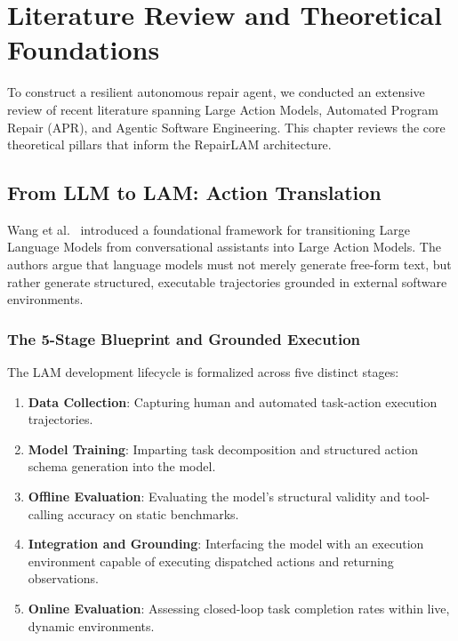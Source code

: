 \documentclass[12pt,a4paper]{report}
\begin{document}
\newpage
\chapter{Literature Review and Theoretical Foundations}

To construct a resilient autonomous repair agent, we conducted an extensive review of recent literature spanning Large Action Models, Automated Program Repair (APR), and Agentic Software Engineering. This chapter reviews the core theoretical pillars that inform the RepairLAM architecture.

\section{From LLM to LAM: Action Translation}
Wang et al.~\cite{wang2024large} introduced a foundational framework for transitioning Large Language Models from conversational assistants into Large Action Models. The authors argue that language models must not merely generate free-form text, but rather generate structured, executable trajectories grounded in external software environments.

\subsection{The 5-Stage Blueprint and Grounded Execution}
The LAM development lifecycle is formalized across five distinct stages:
\begin{enumerate}
    \item \textbf{Data Collection}: Capturing human and automated task-action execution trajectories.
    \item \textbf{Model Training}: Imparting task decomposition and structured action schema generation into the model.
    \item \textbf{Offline Evaluation}: Evaluating the model's structural validity and tool-calling accuracy on static benchmarks.
    \item \textbf{Integration and Grounding}: Interfacing the model with an execution environment capable of executing dispatched actions and returning observations.
    \item \textbf{Online Evaluation}: Assessing closed-loop task completion rates within live, dynamic environments.
\end{enumerate}
\end{document}
